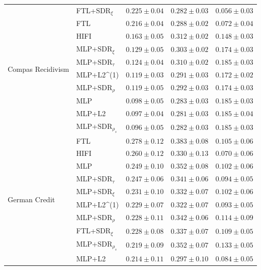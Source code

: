 \begin{tabular}{lllll}
\cline{1-5}
\multirow[t]{10}{*}{Compas Recidivism} & FTL+SDR$_{\xi}$ & $0.225 \pm0.04$ & $0.282 \pm0.03$ & $0.056 \pm0.03$ \\
 & FTL & $0.216 \pm0.04$ & $0.288 \pm0.02$ & $0.072 \pm0.04$ \\
 & HIFI & $0.163 \pm0.05$ & $0.312 \pm0.02$ & $0.148 \pm0.03$ \\
 & MLP+SDR$_{\xi}$ & $0.129 \pm0.05$ & $0.303 \pm0.02$ & $0.174 \pm0.03$ \\
 & MLP+SDR$_{\tau}$ & $0.124 \pm0.04$ & $0.310 \pm0.02$ & $0.185 \pm0.03$ \\
 & MLP+L2^{(1)} & $0.119 \pm0.03$ & $0.291 \pm0.03$ & $0.172 \pm0.02$ \\
 & MLP+SDR$_{\rho}$ & $0.119 \pm0.05$ & $0.292 \pm0.03$ & $0.174 \pm0.03$ \\
 & MLP & $0.098 \pm0.05$ & $0.283 \pm0.03$ & $0.185 \pm0.03$ \\
 & MLP+L2 & $0.097 \pm0.04$ & $0.281 \pm0.03$ & $0.185 \pm0.04$ \\
 & MLP+SDR$_{\rho_s}$ & $0.096 \pm0.05$ & $0.282 \pm0.03$ & $0.185 \pm0.03$ \\
\cline{1-5}
\multirow[t]{10}{*}{German Credit} & FTL & $0.278 \pm0.12$ & $0.383 \pm0.08$ & $0.105 \pm0.06$ \\
 & HIFI & $0.260 \pm0.12$ & $0.330 \pm0.13$ & $0.070 \pm0.06$ \\
 & MLP & $0.249 \pm0.10$ & $0.352 \pm0.08$ & $0.102 \pm0.06$ \\
 & MLP+SDR$_{\tau}$ & $0.247 \pm0.06$ & $0.341 \pm0.06$ & $0.094 \pm0.05$ \\
 & MLP+SDR$_{\xi}$ & $0.231 \pm0.10$ & $0.332 \pm0.07$ & $0.102 \pm0.06$ \\
 & MLP+L2^{(1)} & $0.229 \pm0.07$ & $0.322 \pm0.07$ & $0.093 \pm0.05$ \\
 & MLP+SDR$_{\rho}$ & $0.228 \pm0.11$ & $0.342 \pm0.06$ & $0.114 \pm0.09$ \\
 & FTL+SDR$_{\xi}$ & $0.228 \pm0.08$ & $0.337 \pm0.07$ & $0.109 \pm0.05$ \\
 & MLP+SDR$_{\rho_s}$ & $0.219 \pm0.09$ & $0.352 \pm0.07$ & $0.133 \pm0.05$ \\
 & MLP+L2 & $0.214 \pm0.11$ & $0.297 \pm0.10$ & $0.084 \pm0.05$ \\
\cline{1-5}
\bottomrule
\end{tabular}
